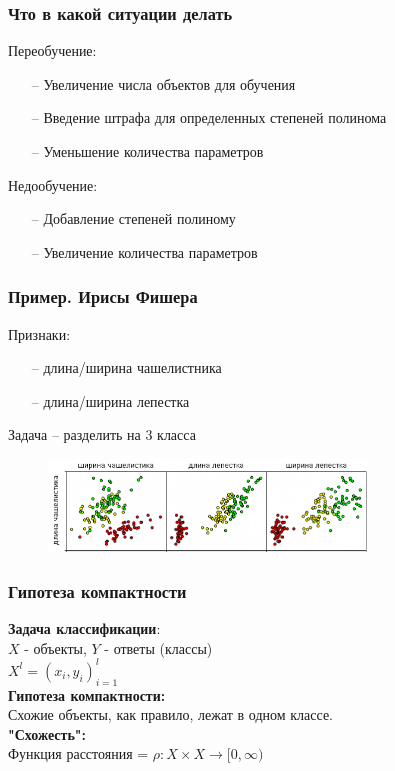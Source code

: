 \documentclass[12pt]{beamer}
\begin{document}
\begin{frame}\frametitle{Что в какой ситуации делать}
Переобучение:
\begin{itemize}
\item[--] Увеличение числа объектов для обучения
\item[--] Введение штрафа для определенных степеней полинома
\item[--] Уменьшение количества параметров
\end{itemize}
\vspace{5mm}
Недообучение:
\begin{itemize}
\item[--] Добавление степеней полиному
\item[--] Увеличение количества параметров
\end{itemize}

\end{frame}


\begin{frame}\frametitle{Пример. Ирисы Фишера}
Признаки:\\
\begin{itemize}
	\item[--] длина/ширина чашелистника
	\item[--] длина/ширина лепестка
\end{itemize}
Задача -- разделить на 3 класса
\begin{figure}[htbp]
  \includegraphics[height=70pt, keepaspectratio = true]{Fisher1}  
\end{figure}
\end{frame}

\begin{frame}\frametitle{Гипотеза компактности}
\textbf{Задача классификации}:\\
$X$ - объекты, $Y$ - ответы (классы)\\
${X^l = (x_i, y_i)_{i=1}^l}$\\
\vspace{5mm}
\textbf{Гипотеза компактности:}\\
Схожие объекты, как правило, лежат в одном классе.\\
\vspace{5mm}
\textbf{"Схожесть":}\\
Функция расстояния = ${\rho: X \times X \rightarrow [0, \infty) }$

\end{frame}
\end{document}
